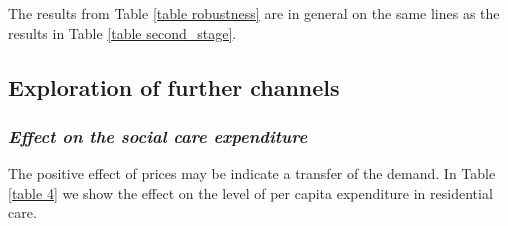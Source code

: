 \documentclass[12pt,letterpaper]{article}
\begin{document}
The results from Table \ref{table robustness}  are in general on the same lines 
as the results in Table \ref{table second_stage}. 

\subsection{Exploration of further channels}

\subsubsection*{\normalsize{\it Effect on the social care expenditure}}

The positive effect of prices  may be indicate a transfer of the demand. In Table \ref{table 4} 
we show the effect on the level of per capita expenditure in residential care. 
\end{document}
